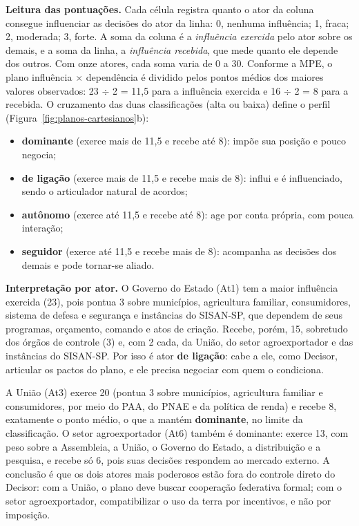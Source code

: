 \documentclass[
	12pt,				%
	openright,			%
	oneside,			%
	a4paper,			%
	chapter=TITLE,		%
	section=TITLE,		%
	english,			%
	french,				%
	spanish,			%
	brazil,				%
 ]{abntex2}
\begin{document}
\textbf{Leitura das pontuações.} Cada célula registra quanto o ator da coluna
consegue influenciar as decisões do ator da linha: 0, nenhuma influência; 1,
fraca; 2, moderada; 3, forte. A soma da coluna é a \textit{influência
exercida} pelo ator sobre os demais, e a soma da linha, a \textit{influência
recebida}, que mede quanto ele depende dos outros. Com onze atores, cada soma
varia de 0 a 30. Conforme a MPE, o plano influência $\times$ dependência é
dividido pelos pontos médios dos maiores valores observados: 23 $\div$ 2 = 11,5
para a influência exercida e 16 $\div$ 2 = 8 para a recebida. O cruzamento das
duas classificações (alta ou baixa) define o perfil
(Figura~\ref{fig:planos-cartesianos}b):

\begin{itemize}
\item \textbf{dominante} (exerce mais de 11,5 e recebe até 8): impõe sua
posição e pouco negocia;
\item \textbf{de ligação} (exerce mais de 11,5 e recebe mais de 8): influi e é
influenciado, sendo o articulador natural de acordos;
\item \textbf{autônomo} (exerce até 11,5 e recebe até 8): age por conta
própria, com pouca interação;
\item \textbf{seguidor} (exerce até 11,5 e recebe mais de 8): acompanha as
decisões dos demais e pode tornar-se aliado.
\end{itemize}

\textbf{Interpretação por ator.} O Governo do Estado (At1) tem a maior
influência exercida (23), pois pontua 3 sobre municípios, agricultura familiar,
consumidores, sistema de defesa e segurança e instâncias do SISAN-SP, que
dependem de seus programas, orçamento, comando e atos de criação. Recebe, porém,
15, sobretudo dos órgãos de controle (3) e, com 2 cada, da União, do setor
agroexportador e das instâncias do SISAN-SP. Por isso é ator \textbf{de
ligação}: cabe a ele, como Decisor, articular os pactos do plano, e ele precisa
negociar com quem o condiciona.

A União (At3) exerce 20 (pontua 3 sobre municípios, agricultura familiar e
consumidores, por meio do PAA, do PNAE e da política de renda) e recebe 8,
exatamente o ponto médio, o que a mantém \textbf{dominante}, no limite da
classificação. O setor agroexportador (At6) também é dominante: exerce 13, com
peso sobre a Assembleia, a União, o Governo do Estado, a distribuição e a
pesquisa, e recebe só 6, pois suas decisões respondem ao mercado externo. A
conclusão é que os dois atores mais poderosos estão fora do controle direto do
Decisor: com a União, o plano deve buscar cooperação federativa formal; com o
setor agroexportador, compatibilizar o uso da terra por incentivos, e não por
imposição.
\end{document}
